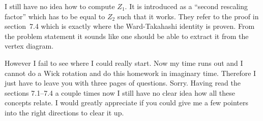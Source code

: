 \documentclass[11pt, english, fleqn, DIV=15, headinclude]{scrartcl}
\begin{document}
\begin{multicols}{2}
    I still have no idea how to compute $Z_1$. It is introduced as a “second
    rescaling factor” \parencite[230]{Peskin/QFT/1995} which has to be equal to
    $Z_2$ such that it works. They refer to the proof in section~7.4 which is
    exactly where the Ward-Takahashi identity is proven. From the problem
    statement it sounds like one should be able to extract it from the vertex
    diagram.

    However I fail to see where I could really start. Now my time runs out and
    I cannot do a Wick rotation and do this homework in imaginary time.
    Therefore I just have to leave you with three pages of questions. Sorry.
    Having read the sections 7.1--7.4 a couple times now I still have no clear
    idea how all these concepts relate. I would greatly appreciate if you could
    give me a few pointers into the right directions to clear it up.
\end{multicols}
\end{document}
